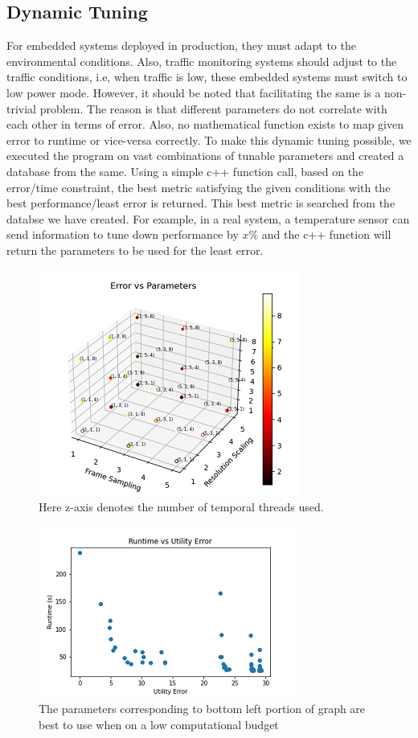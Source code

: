 \documentclass[conference]{IEEEtran}
\begin{document}
\subsection{Dynamic Tuning}

For embedded systems deployed in production, they must adapt to the environmental conditions. Also, traffic monitoring systems should adjust to the traffic conditions,
i.e, when traffic is low, these embedded systems must switch to low power mode.
However, it should be noted that facilitating the same is a non-trivial problem. The reason is that different parameters do not correlate with each other in terms of error. Also, no mathematical function exists to map given error to runtime or vice-versa correctly.
To make this dynamic tuning possible, we executed the program on vast combinations of tunable parameters and created a database from the same.
Using a simple c++ function call, based on the error/time constraint, the best metric satisfying the given conditions with the best performance/least error is returned. This best metric is searched from the databse we have created. For example, in a real system, a temperature sensor can send information to tune down performance by $x\%$ and
the c++ function will return the parameters to be used for the least error.

\begin{figure}[htbp]
    \centerline{\includegraphics{plots/Error_vs_Params.png}}
    \caption{Here z-axis denotes the number of temporal threads used.}
    \label{ca_evp}
\end{figure}

\begin{figure}[htbp]
    \centerline{\includegraphics{plots/CompleteAnalysis_rVe.png}}
    \caption{The parameters corresponding to bottom left portion of graph are best to use when on a low computational budget}
    \label{ca_rve}
\end{figure}
\end{document}
